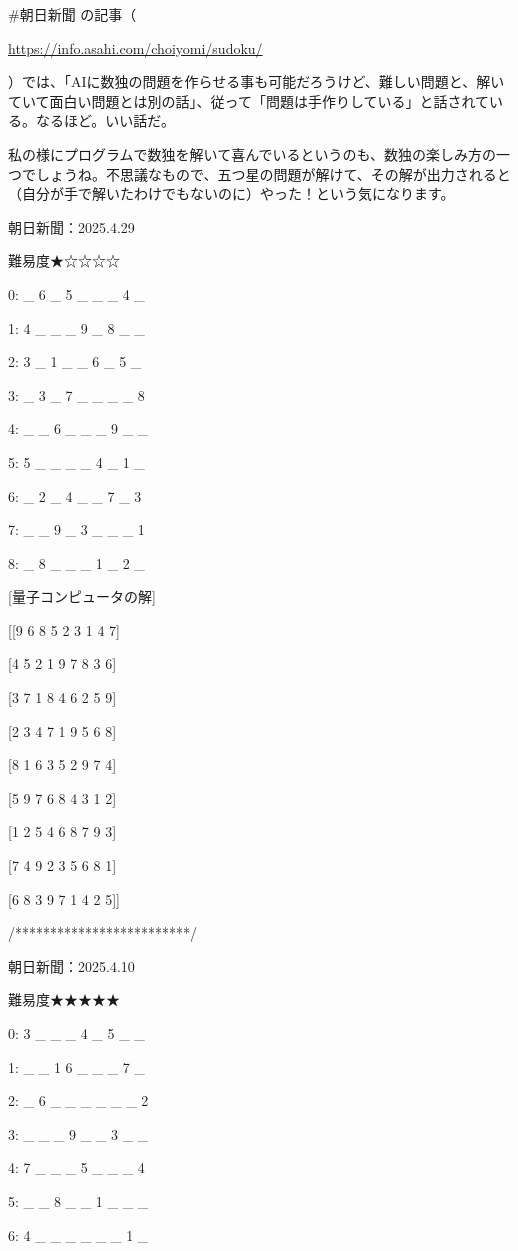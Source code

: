 \documentclass[facebook_diary.tex]{subfiles}
\begin{document}
\#朝日新聞 の記事（

\url{https://info.asahi.com/choiyomi/sudoku/}

）では、「AIに数独の問題を作らせる事も可能だろうけど、難しい問題と、解いていて面白い問題とは別の話」、従って「問題は手作りしている」と話されている。なるほど。いい話だ。


私の様にプログラムで数独を解いて喜んでいるというのも、数独の楽しみ方の一つでしょうね。不思議なもので、五つ星の問題が解けて、その解が出力されると（自分が手で解いたわけでもないのに）やった！という気になります。


朝日新聞：2025.4.29

難易度★☆☆☆☆

0: \_ 6 \_ 5 \_ \_ \_ 4 \_

1: 4 \_ \_ \_ 9 \_ 8 \_ \_

2: 3 \_ 1 \_ \_ 6 \_ 5 \_

3: \_ 3 \_ 7 \_ \_ \_ \_ 8

4: \_ \_ 6 \_ \_ \_ 9 \_ \_

5: 5 \_ \_ \_ \_ 4 \_ 1 \_

6: \_ 2 \_ 4 \_ \_ 7 \_ 3

7: \_ \_ 9 \_ 3 \_ \_ \_ 1

8: \_ 8 \_ \_ \_ 1 \_ 2 \_


[量子コンピュータの解]


[[9 6 8 5 2 3 1 4 7]

[4 5 2 1 9 7 8 3 6]

[3 7 1 8 4 6 2 5 9]

[2 3 4 7 1 9 5 6 8]

[8 1 6 3 5 2 9 7 4]

[5 9 7 6 8 4 3 1 2]

[1 2 5 4 6 8 7 9 3]

[7 4 9 2 3 5 6 8 1]

[6 8 3 9 7 1 4 2 5]]


/*************************/

朝日新聞：2025.4.10

難易度★★★★★

0: 3 \_ \_ \_ 4 \_ 5 \_ \_

1: \_ \_ 1 6 \_ \_ \_ 7 \_

2: \_ 6 \_ \_ \_ \_ \_ \_ 2

3: \_ \_ \_ 9 \_ \_ 3 \_ \_

4: 7 \_ \_ \_ 5 \_ \_ \_ 4

5: \_ \_ 8 \_ \_ 1 \_ \_ \_

6: 4 \_ \_ \_ \_ \_ \_ 1 \_
\end{document}
